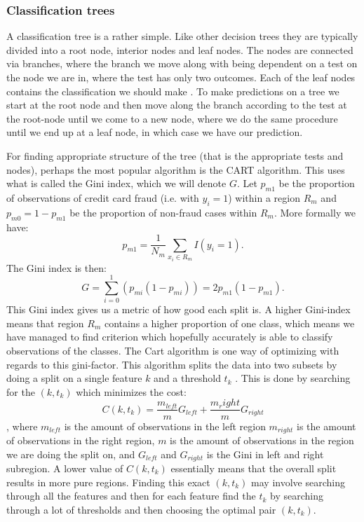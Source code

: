 \documentclass{article}
\begin{document}
\subsubsection{Classification trees}
A classification tree is a rather simple. Like other decision trees they are
typically divided into a root node, interior nodes and leaf nodes. The nodes
are connected via branches, where the branch we move along with being dependent
on a test on the node we are in, where the test has only two outcomes. Each of
the leaf nodes contains the classification we should make
\cite{lecturesweek46}. To make predictions on a tree we start at the root
node and then move along the branch according to the test at the root-node
until we come to a new node, where we do the same procedure until we end up at
a leaf node, in which case we have our prediction.

For finding appropriate structure of the tree (that is the appropriate tests
and nodes), perhaps the most popular algorithm is the CART algorithm. This uses
what is called the Gini index, which we will denote $G$. Let $p_{m 1}$ be the
proportion of observations of credit card fraud (i.e. with $y_i = 1$) within a
region $R_m$ and $p_{m 0} = 1 - p_{m 1}$ be the proportion of non-fraud cases
within $R_m$. More formally we have:
$$p_{m 1} = \frac{1}{N_m} \sum_{x_i \in R_m} I(y_i = 1).$$
The Gini index is then:
$$G = \sum_{i=0}^{1} (p_{m i} (1 - p_{m i})) = 2 p_{m 1} (1 - p_{m 1}).$$
This Gini index gives us a metric of how good each split is. A higher
Gini-index means that region $R_m$ contains a higher proportion of one class,
which means we have managed to find criterion which hopefully accurately is
able to classify observations of the classes. The Cart algorithm is one way of
optimizing with regards to this gini-factor. This algorithm splits the data
into two subsets by doing a split on a single feature $k$ and a threshold $t_k$
\cite[s.~The CART algorithm for Classification]{lecturesweek46}. This is done
by searching for the $(k, t_{k})$ which minimizes the cost:
$$C(k, t_k) = \frac{m_{left}}{m} G_{left} + \frac{m_right}{m} G_{right}$$
, where $m_{left}$ is the amount of observations in the left region $m_{right}$
is the amount of observations in the right region, $m$ is the amount of
observations in the region we are doing the split on, and $G_{left}$ and
$G_{right}$ is the Gini in left and right subregion. A lower value of $C(k,
	t_k)$ essentially means that the overall split results in more pure regions.
Finding this exact $(k, t_k)$ may involve searching through all the features
and then for each feature find the $t_k$ by searching through a lot of
thresholds and then choosing the optimal pair $(k, t_k)$.
\end{document}
